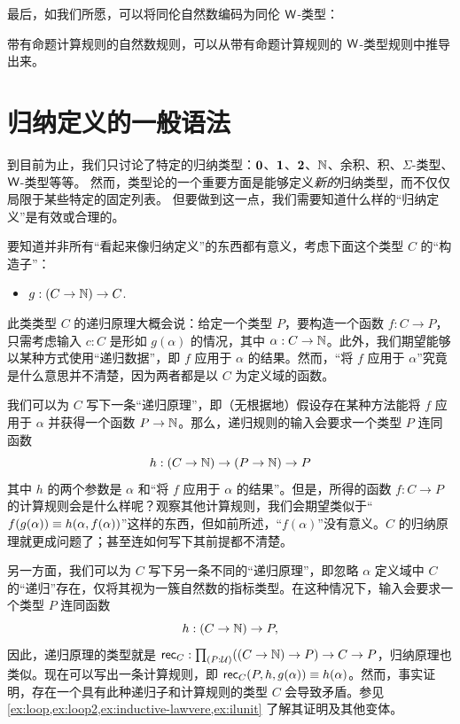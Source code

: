 
%
最后，如我们所愿，可以将同伦自然数编码为同伦 $\mathsf{W}$-类型：

\begin{thm}
带有命题计算规则的自然数规则，可以从带有命题计算规则的 $\mathsf{W}$-类型规则中推导出来。
\end{thm}


\section{归纳定义的一般语法}
\label{sec:strictly-positive}

%
%

到目前为止，我们只讨论了特定的归纳类型：$\mathbf{0}$、$\mathbf{1}$、$\mathbf{2}$、$\mathbb{N}$、余积、积、$\Sigma$-类型、$\mathsf{W}$-类型等等。
然而，类型论的一个重要方面是能够定义\emph{新的}归纳类型，而不仅仅局限于某些特定的固定列表。
但要做到这一点，我们需要知道什么样的“归纳定义”是有效或合理的。

要知道并非所有“看起来像归纳定义”的东西都有意义，考虑下面这个类型 $C$ 的“构造子”：

\begin{itemize}
\item $g:(C\to \mathbb{N}) \to C$.
\end{itemize}

此类类型 $C$ 的递归原理大概会说：给定一个类型 $P$，要构造一个函数 $f:C\to P$，只需考虑输入 $c:C$ 是形如 $g(\alpha)$ 的情况，其中 $\alpha:C\to\mathbb{N}$。此外，我们期望能够以某种方式使用“递归数据”，即 $f$ 应用于 $\alpha$ 的结果。然而，“将 $f$ 应用于 $\alpha$”究竟是什么意思并不清楚，因为两者都是以 $C$ 为定义域的函数。

我们可以为 $C$ 写下一条“递归原理”，即（无根据地）假设存在某种方法能将 $f$ 应用于 $\alpha$ 并获得一个函数 $P\to\mathbb{N}$。那么，递归规则的输入会要求一个类型 $P$ 连同函数
\begin{equation}
  h:(C\to\mathbb{N}) \to (P\to\mathbb{N}) \to P\label{eq:fake-recursor}
\end{equation}
其中 $h$ 的两个参数是 $\alpha$ 和“将 $f$ 应用于 $\alpha$ 的结果”。但是，所得的函数 $f:C\to P$ 的计算规则会是什么样呢？观察其他计算规则，我们会期望类似于“$f(g(\alpha)) \equiv h(\alpha,f(\alpha))$”这样的东西，但如前所述，“$f(\alpha)$”没有意义。$C$ 的归纳原理就更成问题了；甚至连如何写下其前提都不清楚。

另一方面，我们可以为 $C$ 写下另一条不同的“递归原理”，即忽略 $\alpha$ 定义域中 $C$ 的“递归”存在，仅将其视为一簇自然数的指标类型。在这种情况下，输入会要求一个类型 $P$ 连同函数
\begin{equation*}
  h:(C\to \mathbb{N}) \to P,
\end{equation*}
因此，递归原理的类型就是 $\rec{C}:\prd{P:\UU} ((C\to \nat) \to P) \to C\to P$，归纳原理也类似。现在可以写出一条计算规则，即 $\mathsf{rec}_{C}(P,h,g(\alpha))\equiv h(\alpha)$。然而，事实证明，存在一个具有此种递归子和计算规则的类型 $C$ 会导致矛盾。参见 \cref{ex:loop,ex:loop2,ex:inductive-lawvere,ex:ilunit} 了解其证明及其他变体。


